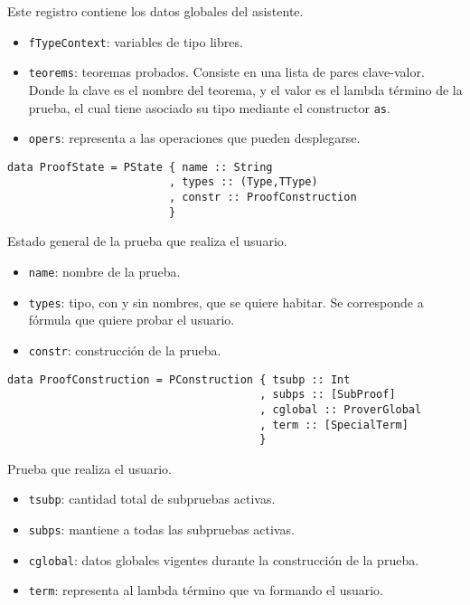 \documentclass[a4paper,11pt]{article}
\begin{document}
Este registro contiene los datos globales del asistente.
\begin{itemize}
  \item \texttt{fTypeContext}: variables de tipo libres.
  \item \texttt{teorems}: teoremas probados. Consiste en una lista de pares clave-valor.
  Donde la clave es el nombre del teorema, y el valor es el lambda término de la prueba,
  el cual tiene asociado su tipo mediante el constructor \texttt{as}.
  \item \texttt{opers}: representa a las operaciones que pueden desplegarse.
\end{itemize}

\begin{verbatim}
data ProofState = PState { name :: String
                         , types :: (Type,TType)
                         , constr :: ProofConstruction
                         }
\end{verbatim}

Estado general de la prueba que realiza el usuario.
\begin{itemize}
  \item \texttt{name}: nombre de la prueba.
  \item \texttt{types}: tipo, con y sin nombres, que se quiere habitar. Se corresponde a fórmula que quiere probar el usuario.
  \item \texttt{constr}: construcción de la prueba.
\end{itemize}

\begin{verbatim}
data ProofConstruction = PConstruction { tsubp :: Int
                                       , subps :: [SubProof]
                                       , cglobal :: ProverGlobal
                                       , term :: [SpecialTerm]
                                       }
\end{verbatim}

Prueba que realiza el usuario.
\begin{itemize}
  \item \texttt{tsubp}: cantidad total de subpruebas activas.
  \item \texttt{subps}: mantiene a todas las subpruebas activas.
  \item \texttt{cglobal}: datos globales vigentes durante la construcción de la prueba.
  \item \texttt{term}: representa al lambda término que va formando el usuario.
\end{itemize}
\end{document}
